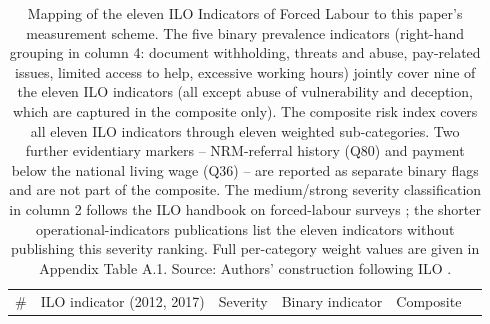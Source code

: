\documentclass[
  12pt,
  letterpaper,
  DIV=11,
  numbers=noendperiod]{scrartcl}
\begin{document}
\begin{longtable}[]{@{}
  >{\raggedleft\arraybackslash}p{}
  >{\raggedright\arraybackslash}p{}
  >{\centering\arraybackslash}p{}
  >{\raggedright\arraybackslash}p{}
  >{\centering\arraybackslash}p{}
  >{\raggedright\arraybackslash}p{}@{}}
\caption{Mapping of the eleven ILO Indicators of Forced Labour to this
paper's measurement scheme. The five binary prevalence indicators
(right-hand grouping in column 4: document withholding, threats and
abuse, pay-related issues, limited access to help, excessive working
hours) jointly cover nine of the eleven ILO indicators (all except abuse
of vulnerability and deception, which are captured in the composite
only). The composite risk index covers all eleven ILO indicators through
eleven weighted sub-categories. Two further evidentiary markers --
NRM-referral history (Q80) and payment below the national living wage
(Q36) -- are reported as separate binary flags and are not part of the
composite. The medium/strong severity classification in column 2 follows
the ILO handbook on forced-labour surveys \autocite{hard24-ilo}; the
shorter operational-indicators publications
\autocite{ILO11-indicators,int25-ilo} list the eleven indicators without
publishing this severity ranking. Full per-category weight values are
given in Appendix Table A.1. Source: Authors' construction following ILO
\autocite*{ILO11-indicators,hard24-ilo,int25-ilo}.}\label{tbl-indicator-mapping}\tabularnewline
\toprule\noalign{}
\begin{minipage}[b]{\linewidth}\raggedleft
\#
\end{minipage} & \begin{minipage}[b]{\linewidth}\raggedright
ILO indicator (2012, 2017)
\end{minipage} & \begin{minipage}[b]{\linewidth}\centering
Severity
\end{minipage} & \begin{minipage}[b]{\linewidth}\raggedright
Binary indicator
\end{minipage} & \begin{minipage}[b]{\linewidth}\centering
Composite
\end{minipage} & \begin{minipage}[b]{\linewidth}\raggedright

\end{minipage}
\end{longtable}
\end{document}
